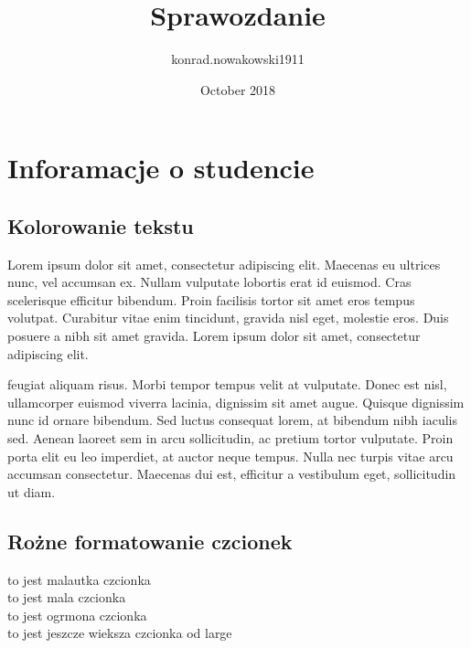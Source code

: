 \documentclass{article}
\title{Sprawozdanie}
\author{konrad.nowakowski1911 }
\date{October 2018}
\begin{document}
\maketitle
\chapter{Inforamacje o studencie}
    \begin{table}[ht]
        \center
        \label{tab:my_label}
    \end{table}




\section{Kolorowanie tekstu}
{\color{red}Lorem ipsum dolor sit amet, consectetur adipiscing elit. Maecenas eu ultrices nunc, vel accumsan ex. Nullam vulputate lobortis erat id euismod. Cras scelerisque efficitur bibendum. Proin facilisis tortor sit amet eros tempus volutpat. Curabitur vitae enim tincidunt, gravida nisl eget, molestie eros. Duis posuere a nibh sit amet gravida. Lorem ipsum dolor sit amet, consectetur adipiscing elit.}

{\color{blue}feugiat aliquam risus. Morbi tempor tempus velit at vulputate. Donec est nisl, ullamcorper euismod viverra lacinia, dignissim sit amet augue. Quisque dignissim nunc id ornare bibendum. Sed luctus consequat lorem, at bibendum nibh iaculis sed. Aenean laoreet sem in arcu sollicitudin, ac pretium tortor vulputate. Proin porta elit eu leo imperdiet, at auctor neque tempus. Nulla nec turpis vitae arcu accumsan consectetur. Maecenas dui est, efficitur a vestibulum eget, sollicitudin ut diam.}



\section{Rożne formatowanie czcionek}
\tiny{to jest malautka czcionka}\\
\small {to jest mala czcionka} \\
\large {to jest ogrmona czcionka}\\
\Large {to jest jeszcze wieksza czcionka od large}
\end{document}
